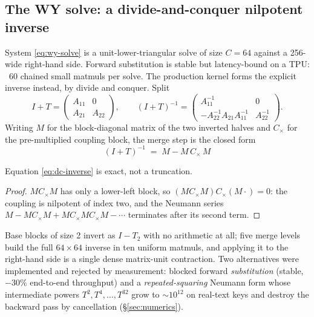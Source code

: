 \subsection{The WY solve: a divide-and-conquer nilpotent inverse}
\label{sec:inverse}

System \eqref{eq:wy-solve} is a unit-lower-triangular solve of size
$C = 64$ against a 256-wide right-hand side. Forward substitution is
stable but latency-bound on a TPU: ~60 chained small matmuls per solve.
The production kernel forms the explicit inverse instead, by
divide and conquer. Split
\begin{equation}
I + T =
\begin{pmatrix} A_{11} & 0 \\ A_{21} & A_{22} \end{pmatrix},
\qquad
(I+T)^{-1} =
\begin{pmatrix} A_{11}^{-1} & 0 \\
-A_{22}^{-1} A_{21} A_{11}^{-1} & A_{22}^{-1} \end{pmatrix}.
\end{equation}
Writing $M$ for the block-diagonal matrix of the two inverted halves and
$C_\times$ for the pre-multiplied coupling block, the merge step is the
closed form
\begin{equation}
\boxed{\;(I+T)^{-1} \;=\; M - M\, C_\times\, M\;}
\label{eq:dc-inverse}
\end{equation}
\begin{proposition}
Equation \eqref{eq:dc-inverse} is exact, not a truncation.
\end{proposition}
\begin{proof}
$M C_\times M$ has only a lower-left block, so $(M C_\times M) C_\times
(M \cdot) = 0$: the coupling is nilpotent of index two, and the Neumann
series $M - M C_\times M + M C_\times M C_\times M - \cdots$ terminates
after its second term.
\end{proof}
Base blocks of size 2 invert as $I - T_{2}$ with no arithmetic at all;
five merge levels build the full $64 \times 64$ inverse in ten uniform
matmuls, and applying it to the right-hand side is a single dense
matrix-unit contraction. Two alternatives were implemented and rejected
by measurement: blocked forward \emph{substitution} (stable, $-30\%$
end-to-end throughput) and a \emph{repeated-squaring} Neumann form whose
intermediate powers $T^2, T^4, \ldots, T^{32}$ grow to $\sim 10^{12}$ on
real-text keys and destroy the backward pass by cancellation
(\S\ref{sec:numerics}).

